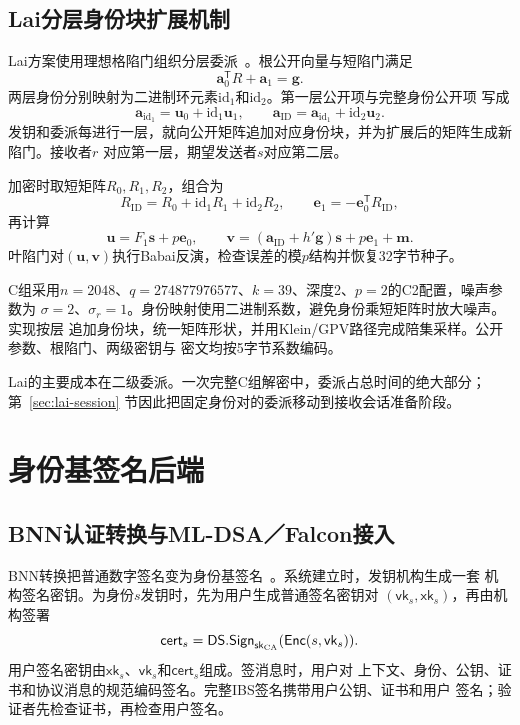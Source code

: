 \subsection{Lai分层身份块扩展机制}

Lai方案使用理想格陷门组织分层委派~\cite{lai2015trapdoors}。根公开向量与短陷门满足
\[
 \mathbf a_0^{\mathsf T}R+\mathbf a_1=\mathbf g.
\]
两层身份分别映射为二进制环元素$\mathrm{id}_1$和$\mathrm{id}_2$。第一层公开项与完整身份公开项
写成
\[
 \mathbf a_{\mathrm{id}_1}=\mathbf u_0+\mathrm{id}_1\mathbf u_1,
 \qquad
 \mathbf a_{\mathrm{ID}}=\mathbf a_{\mathrm{id}_1}+\mathrm{id}_2\mathbf u_2.
\]
发钥和委派每进行一层，就向公开矩阵追加对应身份块，并为扩展后的矩阵生成新陷门。接收者$r$
对应第一层，期望发送者$s$对应第二层。

加密时取短矩阵$R_0,R_1,R_2$，组合为
\[
 R_{\mathrm{ID}}=R_0+\mathrm{id}_1R_1+\mathrm{id}_2R_2,
 \qquad \mathbf e_1=-\mathbf e_0^{\mathsf T}R_{\mathrm{ID}},
\]
再计算
\[
 \mathbf u=F_1\mathbf s+p\mathbf e_0,
 \qquad
 \mathbf v=(\mathbf a_{\mathrm{ID}}+h'\mathbf g)\mathbf s
          +p\mathbf e_1+\mathbf m.
\]
叶陷门对$(\mathbf u,\mathbf v)$执行Babai反演，检查误差的模$p$结构并恢复32字节种子。

C组采用$n=2048$、$q=274877976577$、$k=39$、深度2、$p=2$的C2配置，噪声参数为
$\sigma=2$、$\sigma_r=1$。身份映射使用二进制系数，避免身份乘短矩阵时放大噪声。实现按层
追加身份块，统一矩阵形状，并用Klein/GPV路径完成陪集采样。公开参数、根陷门、两级密钥与
密文均按5字节系数编码。

Lai的主要成本在二级委派。一次完整C组解密中，委派占总时间的绝大部分；第~\ref{sec:lai-session}
节因此把固定身份对的委派移动到接收会话准备阶段。

\section{身份基签名后端}

\subsection{BNN认证转换与ML-DSA／Falcon接入}

BNN转换把普通数字签名变为身份基签名~\cite{galindo2006ibs}。系统建立时，发钥机构生成一套
机构签名密钥。为身份$s$发钥时，先为用户生成普通签名密钥对
$(\mathsf{vk}_s,\mathsf{xk}_s)$，再由机构签署
\[
 \mathsf{cert}_s=\mathsf{DS.Sign}_{\mathsf{sk}_{\rm CA}}
       (\mathsf{Enc}(s,\mathsf{vk}_s)).
\]
用户签名密钥由$\mathsf{xk}_s$、$\mathsf{vk}_s$和$\mathsf{cert}_s$组成。签消息时，用户对
上下文、身份、公钥、证书和协议消息的规范编码签名。完整IBS签名携带用户公钥、证书和用户
签名；验证者先检查证书，再检查用户签名。

